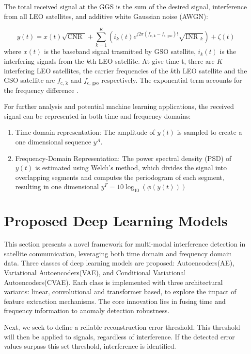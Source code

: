 \documentclass[12pt]{article}
\begin{document}
The total received signal at the GGS is the sum of the desired signal, interference from all LEO satellites, and additive white Gaussian noise (AWGN):

$$
y(t ) = x(t ) \sqrt{\text{CNR }} + \sum_{k=1}^{K } \left(i_{k}(t )e^{j 2 \pi (f_{\text{c, k}}- f_{\text{c, gso}})t} \sqrt{\text{INR }_{k}}\right) + \zeta(t)
$$
where $x(t)$ is the baseband signal trasmitted by GSO satellite, $i_{k}(t)$ is the interfering signals from the $k$th LEO satellite.
At give time t, there are $K$ interfering LEO satellites, the carrier frequencies of the $k $th LEO satellite and the GSO satellite are $f_{\text{c, k}}$ and $f_{\text{c, gso}}$ respectively. The exponential term accounts for the frequency difference .

For further analysis and potential machine learning applications, the received signal can be represented in both time and frequency domains:
\begin{enumerate}
    \item Time-domain representation: The amplitude of $y(t)$ is sampled to create a one dimensional sequence $y^{A}$.
    \item Frequency-Domain Representation: The power spectral density (PSD) of $y(t)$ is estimated using Welch's method, which divides the signal into overlapping segments and computes the periodogram of each segment, resulting in one dimensional $y^{F } = 10 \log_{10}(\phi(y(t )))$
\end{enumerate}

\section{Proposed Deep Learning Models}

This section presents a novel framework for multi-modal interference detection in satellite communication, leveraging both time domain and frequency domain data. Three classes of deep learning models are proposed: Autoencoders(AE), Variational Autoencoders(VAE), and Conditional Variational Autoencoders(CVAE). Each class is implemented with three architectural variants: linear, convolutional and transformer based, to explore the impact of feature extraction mechanisms. The core innovation lies in fusing time and frequency information to anomaly detection robustness.

Next, we seek to define a reliable reconstruction error threshold. This threshold will then be applied to signals, regardless of interference. If the detected error values surpass this set threshold, interference is identified.
\end{document}
